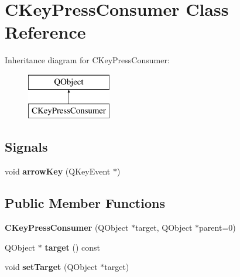 \hypertarget{class_c_key_press_consumer}{}\section{C\+Key\+Press\+Consumer Class Reference}
\label{class_c_key_press_consumer}
Inheritance diagram for C\+Key\+Press\+Consumer\+:\begin{figure}[H]
\begin{center}
\leavevmode
\includegraphics[height=2.000000cm]{class_c_key_press_consumer}
\end{center}
\end{figure}
\subsection*{Signals}
\begin{DoxyCompactItemize}
\item 
\mbox{\label{class_c_key_press_consumer_abd3e27a8c008b39d280eea99adf80924}} 
void {\bfseries arrow\+Key} (Q\+Key\+Event $\ast$)
\end{DoxyCompactItemize}
\subsection*{Public Member Functions}
\begin{DoxyCompactItemize}
\item 
\mbox{\label{class_c_key_press_consumer_aad6cb7bf2063bc363a270617fde0b407}} 
{\bfseries C\+Key\+Press\+Consumer} (Q\+Object $\ast$target, Q\+Object $\ast$parent=0)
\item 
\mbox{\label{class_c_key_press_consumer_a8e68f8ae553d3afc229590c7ae0fe089}} 
Q\+Object $\ast$ {\bfseries target} () const
\item 
\mbox{\label{class_c_key_press_consumer_aa2c4fb57c3ce2a5a9d03719bf5192057}} 
void {\bfseries set\+Target} (Q\+Object $\ast$target)
\end{DoxyCompactItemize}
